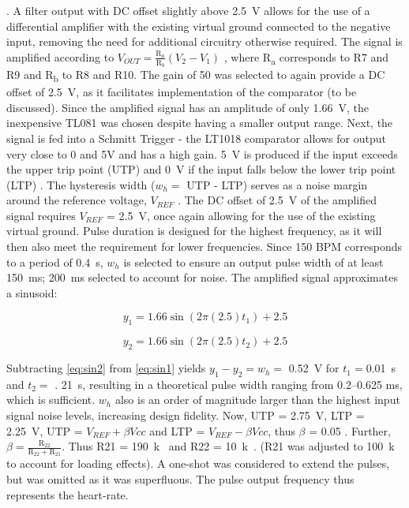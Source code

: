 \cite{filter}. A filter output with DC offset slightly above \SI{2.5}{V} allows for the use of a differential amplifier with the existing virtual ground connected to the negative input, removing the need for additional circuitry otherwise required. The signal is amplified according to ${V}_{{OUT}}=\frac{\mathrm{R}_{a}}{\mathrm{R}_{b}}\left({V}_{2}-{V}_{1}\right)$ \cite{opamp}, where R\textsubscript{a} corresponds to R7 and R9 and R\textsubscript{b} to R8 and R10. The gain of 50 was selected to again provide a DC offset of \SI{2.5}{V}, as it facilitates implementation of the comparator (to be discussed). Since the amplified signal has an amplitude of only \SI{1.66}{V}, the inexpensive TL081 was chosen despite having a smaller output range. Next, the signal is fed into a Schmitt Trigger - the LT1018 comparator allows for output very close to 0 and 5V and has a high gain. \SI{5}{V} is produced if the input exceeds the upper trip point (UTP) and \SI{0}{V} if the input falls below the lower trip point (LTP) \cite{schmitt}. The hysteresis width ($w_h =$ UTP - LTP) serves as a noise margin around the reference voltage, $V_{REF}$ \cite{schmitt}. The DC offset of \SI{2.5}{V} of the amplified signal requires $V_{REF}$ = \SI{2.5}{V}, once again allowing for the use of the existing virtual ground. Pulse duration is designed for the highest frequency, as it will then also meet the requirement for lower frequencies. Since 150 BPM corresponds to a period of \SI{0.4}{s}, $w_h$ is selected to ensure an output pulse width of at least \SI{150}{ms}; \SI{200}{ms} selected to account for noise. The amplified signal approximates a sinusoid:

\noindent\begin{minipage}{.5\linewidth}
\vspace{-0.35cm}
\begin{equation}
    y_1 = 1.66\sin(2\pi(2.5)t_1) + 2.5
    \label{eq:sin1}
\end{equation}
\end{minipage}%
\begin{minipage}{.5\linewidth}
\vspace{-0.35cm}
\begin{equation}
    y_2 = 1.66\sin(2\pi(2.5)t_2) + 2.5
    \label{eq:sin2}
\end{equation}
\end{minipage}

Subtracting \ref{eq:sin2} from \ref{eq:sin1} yields $y_1 - y_2 = w_h =$ \SI{0.52}{V} for $t_1 =$\SI{0.01}{s} and $t_2 =$ \SI{.
21}{s}, resulting in a theoretical pulse width ranging from \numrange{0.2}{0.625} \si{ms}, which is sufficient. $w_h$ also is an order of magnitude larger than the highest input signal noise levels, increasing design fidelity.  Now, UTP = \SI{2.75}{V}, LTP = \SI{2.25}{V}, UTP = $V_{REF} + \beta Vcc$ and LTP = $V_{REF} - \beta Vcc$, thus $\beta$ = 0.05 \cite{schmitt}. Further, $\beta=\frac{\mathrm{R}_{22}}{\mathrm{R}_{22}+\mathrm{R}_{21}}$. Thus R21 = \SI{190}{k\Omega} and R22 = \SI{10}{k\Omega}. (R21 was adjusted to \SI{100}{k\Omega} to account for loading effects). A one-shot was considered to extend the pulses, but was omitted as it was superfluous. The pulse output frequency thus represents the heart-rate.\\

